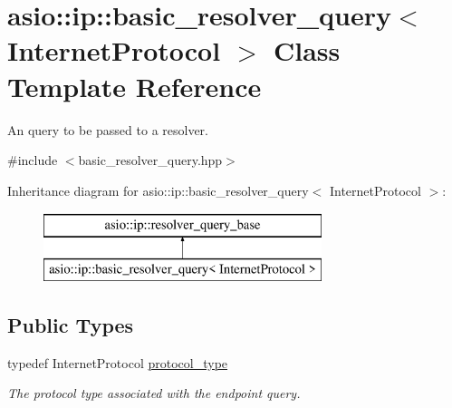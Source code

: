 \hypertarget{classasio_1_1ip_1_1basic__resolver__query}{}\section{asio\+:\+:ip\+:\+:basic\+\_\+resolver\+\_\+query$<$ Internet\+Protocol $>$ Class Template Reference}
\label{classasio_1_1ip_1_1basic__resolver__query}


An query to be passed to a resolver.  




{\ttfamily \#include $<$basic\+\_\+resolver\+\_\+query.\+hpp$>$}

Inheritance diagram for asio\+:\+:ip\+:\+:basic\+\_\+resolver\+\_\+query$<$ Internet\+Protocol $>$\+:\begin{figure}[H]
\begin{center}
\leavevmode
\includegraphics[height=2.000000cm]{classasio_1_1ip_1_1basic__resolver__query}
\end{center}
\end{figure}
\subsection*{Public Types}
\begin{DoxyCompactItemize}
\item 
typedef Internet\+Protocol \hyperlink{classasio_1_1ip_1_1basic__resolver__query_afc47f8001caf9274f6f567ae541e224a}{protocol\+\_\+type}
\begin{DoxyCompactList}\small\item\em The protocol type associated with the endpoint query. \end{DoxyCompactList}\end{DoxyCompactItemize}
